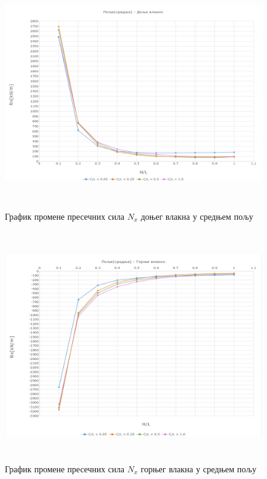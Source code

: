 \documentclass[11pt, a4paper]{article}
\begin{document}
\begin{figure}[H]
	\includegraphics[width=\textwidth, height=10cm]{Slike/Polje_donje.png}
	\caption{График промене пресечних сила $N_x$ доњег влакна у средњем пољу}
\end{figure}

\begin{figure}[H]
	\includegraphics[width=\textwidth, height=10cm]{Slike/Polje_gornje.png}
	\caption{График промене пресечних сила $N_x$ горњег влакна у средњем пољу}
\end{figure}
\end{document}
